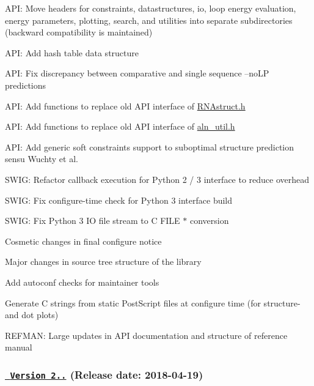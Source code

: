 \begin{DoxyItemize}
\item A\+PI\+: Move headers for constraints, datastructures, io, loop energy evaluation, energy parameters, plotting, search, and utilities into separate subdirectories (backward compatibility is maintained)
\item A\+PI\+: Add hash table data structure
\item A\+PI\+: Fix discrepancy between comparative and single sequence --no\+LP predictions
\item A\+PI\+: Add functions to replace \textquotesingle{}old A\+PI\textquotesingle{} interface of \mbox{\hyperlink{RNAstruct_8h}{R\+N\+Astruct.\+h}}
\item A\+PI\+: Add functions to replace \textquotesingle{}old A\+PI\textquotesingle{} interface of \mbox{\hyperlink{aln__util_8h}{aln\+\_\+util.\+h}}
\item A\+PI\+: Add generic soft constraints support to suboptimal structure prediction sensu Wuchty et al.
\item S\+W\+IG\+: Refactor callback execution for Python 2 / 3 interface to reduce overhead
\item S\+W\+IG\+: Fix configure-\/time check for Python 3 interface build
\item S\+W\+IG\+: Fix Python 3 IO file stream to C F\+I\+LE $\ast$ conversion
\item Cosmetic changes in final configure notice
\item Major changes in source tree structure of the library
\item Add autoconf checks for maintainer tools
\item Generate C strings from static Post\+Script files at configure time (for structure-\/ and dot plots)
\item R\+E\+F\+M\+AN\+: Large updates in A\+PI documentation and structure of reference manual
\end{DoxyItemize}

\subsubsection*{\href{https://github.com/ViennaRNA/ViennaRNA/compare/v2.4.5...v2.4.6}{\texttt{ Version 2..}} (Release date\+: 2018-\/04-\/19)}


